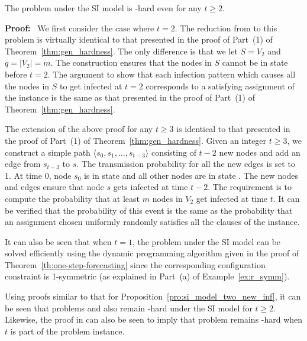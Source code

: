 \begin{proposition}\label{pro:si_model_two_new_inf}
The \tNewInfs{} problem under the SI model is \cnump-hard 
even for any $t \geq 2$.
\end{proposition}

\medskip
\noindent
\textbf{Proof:}~ We first consider the case where $t = 2$.
The reduction from \mtsat{} to this problem is virtually identical to that
presented in the proof of Part~(1) of Theorem~\ref{thm:gen_hardness}.
The only difference is that we let $S = V_2$ and
$q = |V_2| = m$. 
The construction ensures that the nodes in $S$ cannot be in state \istate{} 
before $t = 2$.
The argument to show that each infection pattern which causes all
the nodes in $S$ to get infected at $t = 2$ corresponds to a
satisfying assignment of the \mtsat{} instance is the same
as that presented in the proof of Part~(1) of 
Theorem~\ref{thm:gen_hardness}.

The extension of the above proof for any $t \geq 3$ is identical to that 
presented in the proof of Part~(1) of Theorem~\ref{thm:gen_hardness}.
Given an integer $t \geq 3$, we construct a simple path
$\langle s_0, s_1, \ldots, s_{t-3}\rangle$
consisting of $t-2$ new nodes and add an edge from $s_{t-3}$ to $s$.
The transmission probability for all the new edges is set to 1.
At time 0, node $s_0$ is in state \istate{} and all
other nodes are in state \sstate.
The new nodes and edges ensure that
node $s$ gets infected at time $t-2$.
The requirement is to compute the probability that at least $m$
nodes in $V_2$ get infected at time $t$.
It can be verified that the probability of this event is the
same as the probability that an assignment chosen uniformly
randomly satisfies all the clauses of the \mtsat{} instance.
\QED

It can also be seen that when $t = 1$, the \tNewInfs{} problem
under the SI model can be solved efficiently using the dynamic
programming algorithm given in the proof of 
Theorem~\ref{th:one-step-forecasting} since the corresponding
configuration constraint is 1-symmetric 
(as explained in Part~(a) of Example~\ref{ex:r_symm}).

Using proofs similar to that for Proposition~\ref{pro:si_model_two_new_inf},
it can be seen that problems \tTotInfs{} and \tPeak{} also remain \cnump-hard
under the SI model for $t \geq 2$.
Likewise, the proof in \cite{SD-2012} can also be seen to imply
that \tVuls{} problem remains \cnump-hard when $t$ is part of the problem instance.

